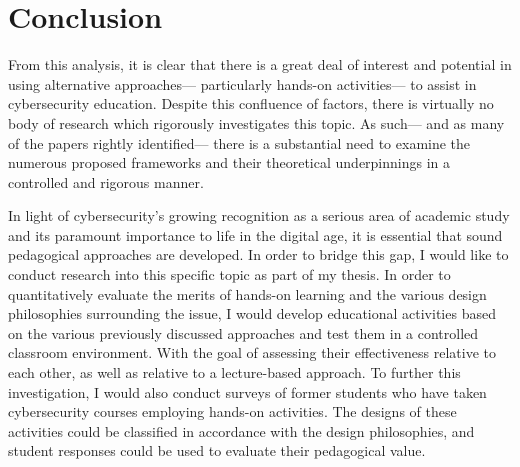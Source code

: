 \section{Conclusion}

    From this analysis, it is clear that there is a great deal of interest and potential in using alternative approaches---%
particularly hands-on activities---%
to assist in cybersecurity education. %
Despite this confluence of factors, there is virtually no body of research which rigorously investigates this topic. %
As such---%
and as many of the papers rightly identified---%
there is a substantial need to examine the numerous proposed frameworks and their theoretical underpinnings in a controlled and rigorous manner. 

    In light of cybersecurity's growing recognition as a serious area of academic study and its paramount importance to life in the digital age, it is essential that sound pedagogical approaches are developed. %
In order to bridge this gap, I would like to conduct research into this specific topic as part of my thesis. %
In order to quantitatively evaluate the merits of hands-on learning and the various design philosophies surrounding the issue, I would develop educational activities based on the various previously discussed approaches and test them in a controlled classroom environment. %
With the goal of assessing their effectiveness relative to each other, as well as relative to a lecture-based approach. %
To further this investigation, I would also conduct surveys of former students who have taken cybersecurity courses employing hands-on activities. %
The designs of these activities could be classified in accordance with the design philosophies, and student responses could be used to evaluate their pedagogical value. %
